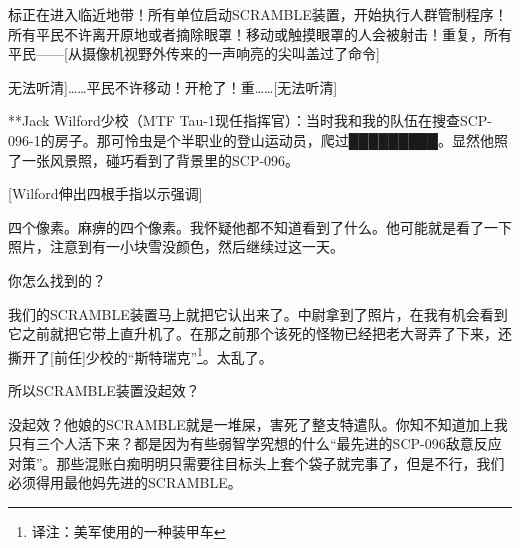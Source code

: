 

\begin{scpbox}




标正在进入临近地带！所有单位启动SCRAMBLE装置，开始执行人群管制程序！所有平民不许离开原地或者摘除眼罩！移动或触摸眼罩的人会被射击！重复，所有平民——{[}从摄像机视野外传来的一声响亮的尖叫盖过了命令]


\bb{扬声器中传出的身份不明的声音：}{[}无法听清]……平民不许移动！开枪了！重……{[}无法听清]



\end{scpbox}

\begin{scpbox}



**Jack Wilford少校（MTF Tau-1现任指挥官）：当时我和我的队伍在搜查SCP-096-1的房子。那可怜虫是个半职业的登山运动员，爬过█████████。显然他照了一张风景照，碰巧看到了背景里的SCP-096。

{[}Wilford伸出四根手指以示强调]

四个像素。麻痹的四个像素。我怀疑他都不知道看到了什么。他可能就是看了一下照片，注意到有一小块雪没颜色，然后继续过这一天。

你怎么找到的？

我们的SCRAMBLE装置马上就把它认出来了。中尉拿到了照片，在我有机会看到它之前就把它带上直升机了。在那之前那个该死的怪物已经把老大哥弄了下来，还撕开了{[}前任]少校的“斯特瑞克”\footnote{译注：美军使用的一种装甲车}。太乱了。

所以SCRAMBLE装置没起效？

没起效？他娘的SCRAMBLE就是一堆屎，害死了整支特遣队。你知不知道加上我只有三个人活下来？都是因为有些弱智学究想的什么“最先进的SCP-096敌意反应对策”。那些混账白痴明明只需要往目标头上套个袋子就完事了，但是不行，我们必须得用最他妈先进的SCRAMBLE。


\end{scpbox}

